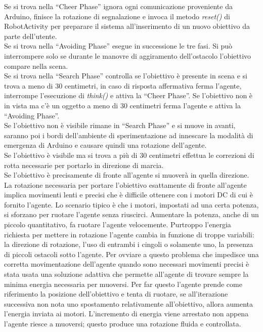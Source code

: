 Se si trova nella ``Cheer Phase'' ignora ogni comunicazione proveniente da 
Arduino, finisce la rotazione di segnalazione e invoca il metodo \emph{reset()} di 
RobotActivity per preparare il sistema all'inserimento di un nuovo obiettivo da 
parte dell'utente.\\
Se si trova nella ``Avoiding Phase'' esegue in successione le tre fasi. 
Si può interrompere solo se durante le manovre di aggiramento dell'ostacolo
l'obiettivo compare nella scena.\\
Se si trova nella ``Search Phase'' controlla se l'obiettivo è presente in scena e 
si trova a meno di 30 centimetri, in caso di risposta affermativa ferma l'agente,
interrompe l'esecuzione di \emph{think()} e attiva la ``Cheer Phase''. 
Se l'obiettivo non è in vista ma c'è un oggetto a meno di 30 centimetri ferma l'agente
e attiva la ``Avoiding Phase''.\\
Se l'obiettivo non è visibile rimane in ``Search Phase'' e si muove in avanti, 
saranno poi i bordi dell'ambiente di sperimentazione ad innescare la modalità di 
emergenza di Arduino e causare quindi una rotazione dell'agente.\\
Se l'obiettivo è visibile ma si trova a più di 30 centimetri effettua le correzioni di rotta
necessarie per portarlo in direzione di marcia.\\
Se l'obiettivo è precisamente di fronte all'agente si muoverà in quella direzione.\\ 
La rotazione necessaria per portare l'obiettivo esattamente di fronte all'agente 
implica movimenti lenti e precisi che è difficile ottenere con i motori DC di cui è
fornito l'agente. Lo scenario tipico è che i motori, impostati ad una certa potenza, 
si sforzano per ruotare l'agente senza riuscirci. Aumentare la potenza, anche di un piccolo 
quantitativo, fa ruotare l'agente velocemente. Purtroppo l'energia richiesta per 
mettere in rotazione l'agente cambia in funzione di troppe variabili: 
la direzione di rotazione, l'uso di entrambi i cingoli o solamente uno, 
la presenza di piccoli ostacoli sotto l'agente. Per ovviare a questo problema che impedisce 
una corretta movimentazione dell'agente quando sono necessari movimenti precisi 
è stata usata una soluzione adattiva che permette all'agente di trovare sempre la 
minima energia necessaria per muoversi. Per far questo l'agente prende come riferimento 
la posizione dell'obiettivo e tenta di ruotare, se all'iterazione successiva 
non nota uno spostamento relativamente all'obiettivo, allora aumenta 
l'energia inviata ai motori. L'incremento di energia viene arrestato non appena 
l'agente riesce a muoversi; questo produce una rotazione fluida e controllata.

